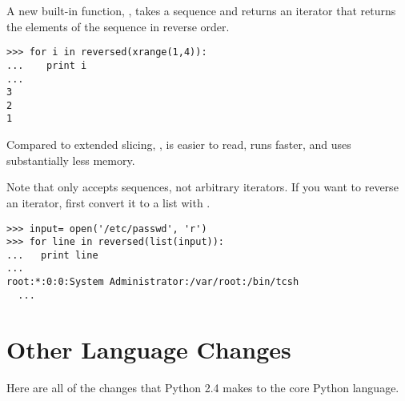 \documentclass{howto}
\begin{document}
A new built-in function, , takes a sequence
and returns an iterator that returns the elements of the sequence 
in reverse order.  

\begin{verbatim}
>>> for i in reversed(xrange(1,4)):
...    print i
... 
3
2
1
\end{verbatim}

Compared to extended slicing, , 
is easier to read, runs faster, and uses substantially less memory.

Note that  only accepts sequences, not arbitrary
iterators.  If you want to reverse an iterator, first convert it to 
a list with .

\begin{verbatim}
>>> input= open('/etc/passwd', 'r')
>>> for line in reversed(list(input)):
...   print line
... 
root:*:0:0:System Administrator:/var/root:/bin/tcsh
  ...
\end{verbatim}

\begin{seealso}

\end{seealso}


\section{Other Language Changes}

Here are all of the changes that Python 2.4 makes to the core Python
language.
\end{document}
